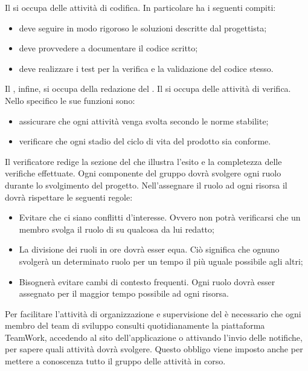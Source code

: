 				Il  si occupa delle attività di codifica. In particolare ha i seguenti compiti:
				\begin{itemize}
					\item deve seguire in modo rigoroso le soluzioni descritte dal progettista;
					\item deve provvedere a documentare il codice scritto;
					\item deve realizzare i test per la verifica e la validazione del codice stesso.
				\end{itemize}
				Il , infine, si occupa della redazione del .
				Il  si occupa delle attività di verifica. Nello specifico le sue funzioni sono:
				\begin{itemize}
					\item assicurare che ogni attività venga svolta secondo le norme stabilite;
					\item verificare che ogni stadio del ciclo di vita del prodotto sia conforme.
				\end{itemize}
				Il verificatore redige la sezione del  che illustra l’esito e la completezza delle verifiche effettuate.
			Ogni componente del gruppo dovrà svolgere ogni ruolo durante lo svolgimento del progetto. Nell'assegnare il ruolo ad ogni risorsa
			il  dovrà rispettare le seguenti regole:
			\begin{itemize}
				\item Evitare che ci siano conflitti d'interesse. Ovvero non potrà verificarsi che un membro svolga il ruolo di 
				su qualcosa da lui redatto;
				\item La divisione dei ruoli in ore dovrà esser equa. Ciò significa che ognuno svolgerà un determinato ruolo per un tempo il più
				uguale possibile agli altri;
				\item Bisognerà evitare cambi di contesto frequenti. Ogni ruolo dovrà esser assegnato per il maggior tempo possibile ad ogni risorsa.
			\end{itemize}
		 \label{subsec:aggiornamentoStatoTicket}
			Per facilitare l'attività di organizzazione e supervisione del  è necessario che ogni membro del team di sviluppo consulti quotidianamente la piattaforma TeamWork, accedendo al sito dell'applicazione o attivando l'invio delle notifiche, per sapere quali attività dovrà svolgere. Questo obbligo viene imposto anche per mettere a conoscenza tutto il gruppo delle attività in corso.\\
